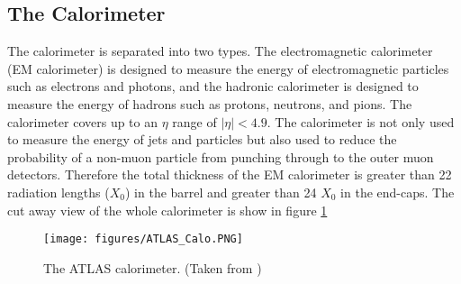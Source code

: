 \subsection{The Calorimeter}
\label{LHC:Calorimeter}
\indent The calorimeter is separated into two types. The electromagnetic calorimeter (EM calorimeter) is designed to measure the energy of electromagnetic particles such as electrons and photons, and the hadronic calorimeter is designed to measure the energy of hadrons such as protons, neutrons, and pions. The calorimeter covers up to an $\eta$ range of $|\eta| < 4.9$. The calorimeter is not only used to measure the energy of jets and particles but also used to reduce the probability of a non-muon particle from punching through to the outer muon detectors. Therefore the total thickness of the EM calorimeter is greater than 22 radiation lengths ($X_0$) in the barrel and greater than 24 $X_0$ in the end-caps.\cite{biblio:JINST} The cut away view of the whole calorimeter is show in figure \ref{LHC:fig:ATLASCalo} ~\\
\begin{figure}[h!]
\centering
\texttt{[image: figures/ATLAS\_Calo.PNG]}
\caption{ The ATLAS calorimeter. (Taken from \cite{biblio:JINST}) \label{LHC:fig:ATLASCalo}}
\end{figure}

